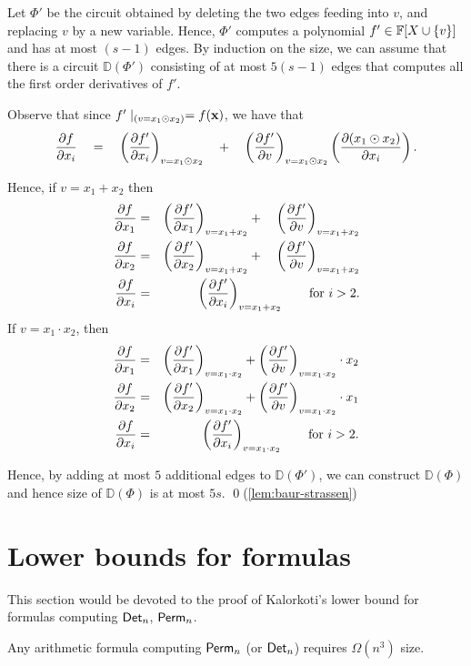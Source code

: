 Let $\Phi'$ be the circuit obtained by deleting the two edges feeding into $v$, and replacing $v$ by a new variable. 
Hence, $\Phi'$ computes a polynomial $f' \in \mathbb{F}[X\cup \left\{v\right\}]$ and has at most $(s-1)$ edges. 
By induction on the size, we can assume that there is a circuit $\mathbb{D}(\Phi')$ consisting of at most $5(s-1)$ edges that computes all the first order derivatives of $f'$.

Observe that since $f'\mid_{(v = x_1 \odot x_2)} = f(\mathbf{x})$,  we have that 
$$
\frac{\partial f}{\partial x_i} \quad = \quad\left(\frac{\partial f'}{\partial x_i}\right)_{v = x_1 \odot x_2} \quad+\quad  \left(\frac{\partial f'}{\partial v}\right)_{v = x_1 \odot x_2}\left(\frac{\partial (x_1 \odot x_2)}{\partial x_i}\right).
$$

Hence, if $v = x_1 + x_2$ then
\begin{eqnarray*}
  \frac{\partial f}{\partial x_1} & = & \left(\frac{\partial f'}{\partial x_1}\right)_{v=x_1 + x_2} +\quad \left(\frac{\partial f'}{\partial v}\right)_{v = x_1 + x_2}\\
  \frac{\partial f}{\partial x_2} & = & \left(\frac{\partial f'}{\partial x_2}\right)_{v=x_1 + x_2} +\quad \left(\frac{\partial f'}{\partial v}\right)_{v = x_1 + x_2}\\
  \frac{\partial f}{\partial x_i} & = & \left(\frac{\partial f'}{\partial x_i}\right)_{v=x_1 + x_2} \qquad\text{for $i>2$}.
\end{eqnarray*}
If $v = x_1 \cdot x_2$, then
\begin{eqnarray*}
  \frac{\partial f}{\partial x_1} & = & \left(\frac{\partial f'}{\partial x_1}\right)_{v=x_1 \cdot x_2} + \left(\frac{\partial f'}{\partial v}\right)_{v = x_1 \cdot x_2} \cdot x_2\\
  \frac{\partial f}{\partial x_2} & = & \left(\frac{\partial f'}{\partial x_2}\right)_{v=x_1 \cdot x_2} + \left(\frac{\partial f'}{\partial v}\right)_{v = x_1\cdot x_2}\cdot x_1\\
  \frac{\partial f}{\partial x_i} & = & \left(\frac{\partial f'}{\partial x_i}\right)_{v=x_1 \cdot x_2} \qquad\text{for $i>2$}.
\end{eqnarray*}

Hence, by adding at most $5$ additional edges to $\mathbb{D}(\Phi')$, we can construct $\mathbb{D}(\Phi)$ and hence size of $\mathbb{D}(\Phi)$ is at most $5s$. \qed (\autoref{lem:baur-strassen})

\section{Lower bounds for formulas}\label{sec:Kalorkoti}

This section would be devoted to the proof of Kalorkoti's lower bound
\cite{k85} for formulas computing $\operatorname{\mathsf{Det}}_n$, $\operatorname{\mathsf{Perm}}_n$.

\begin{theorem}[\cite{k85}]\label{thm:kalorkoti}
  Any arithmetic formula computing $\operatorname{\mathsf{Perm}}_n$ (or $\operatorname{\mathsf{Det}}_n$) requires
  $\Omega(n^3)$ size.
\end{theorem}

